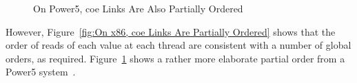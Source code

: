 \documentclass[10]{article}
\begin{document}
\begin{figure}[tb]
\begin{center}
\caption{On Power5, coe Links Are Also Partially Ordered}
\label{fig:On Power5, coe Links Are Also Partially Ordered}
\end{center}
\end{figure}

However, Figure~\ref{fig:On x86, coe Links Are Partially Ordered}
shows that the order of reads of each value at each thread are
consistent with a number of global orders, as required.
Figure~\ref{fig:On Power5, coe Links Are Also Partially Ordered}
shows a rather more elaborate partial order from a Power5
system~\cite{McKenney2018ParallelProgramming-2018-12-08a}.
\end{document}
